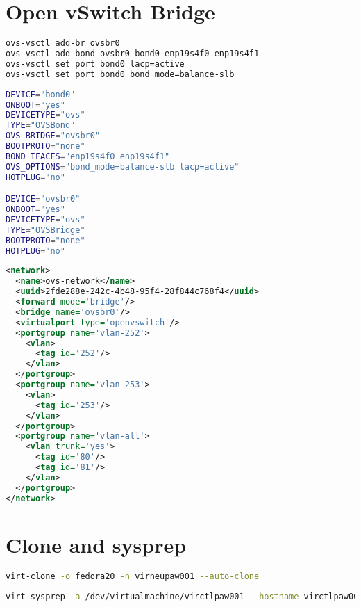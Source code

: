 \documentclass[11pt,letterpaper,oneside]{book}
\begin{document}
\section{Open vSwitch Bridge}
\begin{lstlisting}[caption={Open vSwitch},language=bash]
ovs-vsctl add-br ovsbr0
ovs-vsctl add-bond ovsbr0 bond0 enp19s4f0 enp19s4f1
ovs-vsctl set port bond0 lacp=active
ovs-vsctl set port bond0 bond_mode=balance-slb
\end{lstlisting}

\begin{lstlisting}[caption={ifcfg scripts},language=bash]
DEVICE="bond0"
ONBOOT="yes"
DEVICETYPE="ovs"
TYPE="OVSBond"
OVS_BRIDGE="ovsbr0"
BOOTPROTO="none"
BOND_IFACES="enp19s4f0 enp19s4f1"
OVS_OPTIONS="bond_mode=balance-slb lacp=active"
HOTPLUG="no"

DEVICE="ovsbr0"
ONBOOT="yes"
DEVICETYPE="ovs"
TYPE="OVSBridge"
BOOTPROTO="none"
HOTPLUG="no"
\end{lstlisting}


\begin{lstlisting}[caption={Libvirt and Open vSwitch},language=xml]
<network>
  <name>ovs-network</name>
  <uuid>2fde288e-242c-4b48-95f4-28f844c768f4</uuid>
  <forward mode='bridge'/>
  <bridge name='ovsbr0'/>
  <virtualport type='openvswitch'/>
  <portgroup name='vlan-252'>
    <vlan>
      <tag id='252'/>
    </vlan>
  </portgroup>
  <portgroup name='vlan-253'>
    <vlan>
      <tag id='253'/>
    </vlan>
  </portgroup>
  <portgroup name='vlan-all'>
    <vlan trunk='yes'>
      <tag id='80'/>
      <tag id='81'/>
    </vlan>
  </portgroup>
</network>
\end{lstlisting}

\section{Clone and sysprep}
\begin{lstlisting}[caption={Clone using virt-clone},language=bash]
virt-clone -o fedora20 -n virneupaw001 --auto-clone
\end{lstlisting}

\begin{lstlisting}[caption={Sysprep using virt-sysprep},language=bash]
virt-sysprep -a /dev/virtualmachine/virctlpaw001 --hostname virctlpaw001.virtomation.com --firstboot-command "sed -i -r 's/IPADDR=(\b[0-9]{1,3}\.){3}[0-9]{1,3}\b'/IPADDR=10.53.252.61/ /etc/sysconfig/network-scripts/ifcfg-eth0" --firstboot-command 'systemctl restart network' --firstboot-command 'yum install -y http://rdo.fedorapeople.org/rdo-release.rpm' --firstboot-command 'yum install openstack-packstack -y' 
\end{lstlisting}
\end{document}

